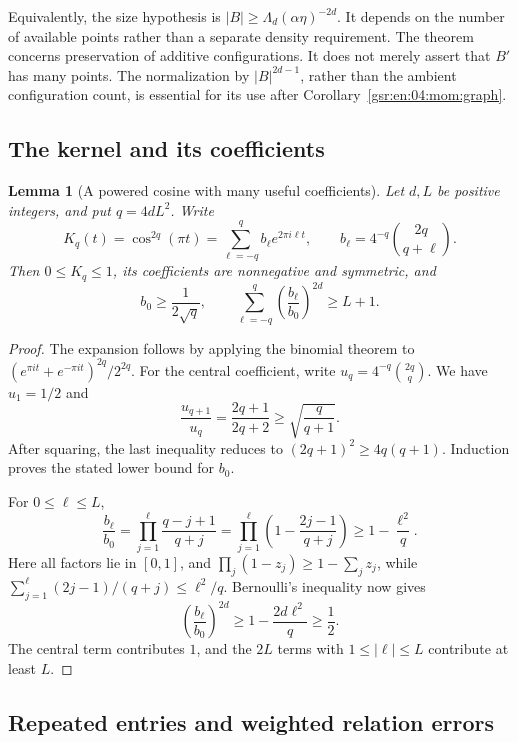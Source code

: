 \documentclass[11pt,letterpaper]{article}
\numberwithin{equation}{section}
\newtheorem{lemma}[theorem]{Lemma}
\theoremstyle{definition}
\theoremstyle{remark}
\newcommand{\1}{\mathbf 1}
\newcommand{\abs}[1]{\left|#1\right|}
\begin{document}
Equivalently, the size hypothesis is
\(\abs B\geq\Lambda_d(\alpha\eta)^{-2d}\).
It depends on the number of available points rather than a
separate density requirement.
The theorem concerns preservation of additive configurations.
It does not merely assert that \(B'\) has many points.  The
normalization by \(\abs B^{2d-1}\), rather than the ambient
configuration count, is essential for its use after
Corollary~\ref{gsr:en:04:mom:graph}.

\subsection{The kernel and its coefficients}

\begin{lemma}[A powered cosine with many useful coefficients]
\label{gsr:en:04:rest:kernel}
Let \(d,L\) be positive integers, and put \(q=4dL^2\).  Write
\[
 K_q(t)=\cos^{2q}(\pi t)
       =\sum_{\ell=-q}^q b_\ell e^{2\pi i\ell t},
 \qquad
 b_\ell=4^{-q}\binom{2q}{q+\ell}.
 \tag{R8}
\]
Then \(0\leq K_q\leq1\), its coefficients are nonnegative and
symmetric, and
\[
 b_0\geq\frac1{2\sqrt q},
 \qquad
 \sum_{\ell=-q}^q
       \left(\frac{b_\ell}{b_0}\right)^{2d}\geq L+1.
 \tag{R9}
\]
\end{lemma}

\begin{proof}
The expansion follows by applying the binomial theorem to
\((e^{\pi it}+e^{-\pi it})^{2q}/2^{2q}\).
For the central coefficient, write
\(u_q=4^{-q}\binom{2q}{q}\).  We have \(u_1=1/2\) and
\[
 \frac{u_{q+1}}{u_q}
       =\frac{2q+1}{2q+2}
       \geq\sqrt{\frac q{q+1}}.
\]
After squaring, the last inequality reduces to
\((2q+1)^2\geq4q(q+1)\).  Induction proves the stated lower
bound for \(b_0\).

For \(0\leq\ell\leq L\),
\[
 \frac{b_\ell}{b_0}
 =
 \prod_{j=1}^{\ell}\frac{q-j+1}{q+j}
 =
 \prod_{j=1}^{\ell}
       \left(1-\frac{2j-1}{q+j}\right)
 \geq1-\frac{\ell^2}{q}.
 \tag{R10}
\]
Here all factors lie in \([0,1]\), and
\(\prod_j(1-z_j)\geq1-\sum_jz_j\), while
\(\sum_{j=1}^{\ell}(2j-1)/(q+j)\leq\ell^2/q\).
Bernoulli's inequality now gives
\[
 \left(\frac{b_\ell}{b_0}\right)^{2d}
       \geq1-\frac{2d\ell^2}{q}\geq\frac12.
 \tag{R11}
\]
The central term contributes \(1\), and the \(2L\) terms with
\(1\leq\abs\ell\leq L\) contribute at least \(L\).
\end{proof}

\subsection{Repeated entries and weighted relation errors}
\end{document}
